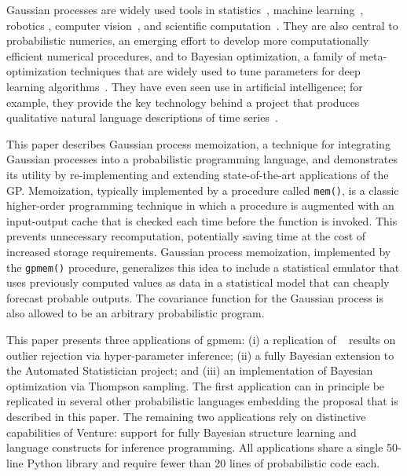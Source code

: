 Gaussian processes are widely used tools in statistics~\citep{barry1986nonparametric}, machine learning~\citep{neal1995bayesian,williams1998bayesian,kuss2005assessing,rasmussen2006gaussian,damianou2013deep}, robotics \citep{ferris2006gaussian}, computer vision~\citep{kemmler2013one}, and scientific computation~\citep{kennedy2001bayesian,schneider2008simulations,kwan2013cosmic}.
They are also central to probabilistic numerics, an emerging effort to develop more computationally efficient numerical procedures, and to Bayesian optimization, a family of meta-optimization techniques that are widely used to tune parameters for deep learning algorithms~\citep{snoek2012practical,gelbart2014bayesian}. They have even seen use in artificial intelligence; for example, they provide the key technology behind a project that produces qualitative natural language descriptions of time series~\citep{duvenaud2013structure,lloyd2014automatic}.

This paper describes Gaussian process memoization, a technique for integrating Gaussian processes into a probabilistic programming language, and demonstrates its utility by re-implementing and extending state-of-the-art applications of the GP. Memoization, typically implemented by a procedure called {\tt mem()}, is a classic higher-order programming technique in which a procedure is augmented with an input-output cache that is checked each time before the function is invoked. This prevents unnecessary recomputation, potentially saving time at the cost of increased storage requirements. Gaussian process memoization, implemented by the {\tt gpmem()} procedure, generalizes this idea to include a statistical emulator that uses previously computed values as data in a statistical model that can cheaply forecast probable outputs. The covariance function for the Gaussian process is also allowed to be an arbitrary probabilistic program.

This paper presents three applications of gpmem: (i) a replication of ~\citep{neal1997monte} results on outlier rejection via hyper-parameter inference; (ii) a fully Bayesian extension to the Automated Statistician project; and (iii) an implementation of Bayesian optimization via Thompson sampling. The first application can in principle be replicated in several other probabilistic languages embedding the proposal that is described in this paper. The remaining two applications rely on distinctive capabilities of Venture: support for fully Bayesian structure learning and language constructs for inference programming. All applications share a single 50-line Python library and require fewer than 20 lines of probabilistic code each.



